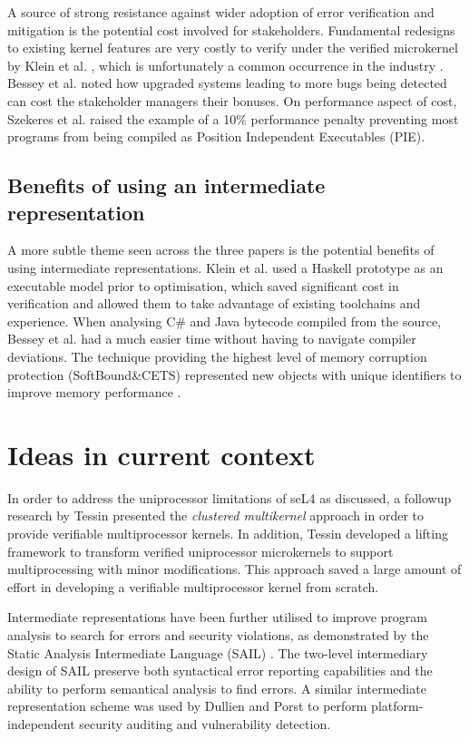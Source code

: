 \documentclass[11pt]{article}
\begin{document}
A source of strong resistance against wider adoption of error verification and mitigation is the potential cost involved for stakeholders. Fundamental redesigns to existing kernel features are very costly to verify under the verified microkernel by Klein et al. \cite[5.3]{klein2009sel4}, which is unfortunately a common occurrence in the industry \cite{israeli2010linux}. Bessey et al. \cite[p. 73]{bessey2010few} noted how upgraded systems leading to more bugs being detected can cost the stakeholder managers their bonuses. On performance aspect of cost, Szekeres et al. \cite[V-A]{szekeres2013sok} raised the example of a 10\% performance penalty preventing most programs from being compiled as Position Independent Executables (PIE).

\subsection{Benefits of using an intermediate representation}

A more subtle theme seen across the three papers is the potential benefits of using intermediate representations. Klein et al. \cite[2.2, 5.2]{klein2009sel4} used a Haskell prototype as an executable model prior to optimisation, which saved significant cost in verification and allowed them to take advantage of existing toolchains and experience. When analysing C\# and Java bytecode compiled from the source, Bessey et al. \cite[p. 72]{bessey2010few} had a much easier time without having to navigate compiler deviations. The technique providing the highest level of memory corruption protection (SoftBound\&CETS) represented new objects with unique identifiers to improve memory performance \cite[VI-C]{szekeres2013sok}. 

\section{Ideas in current context}

In order to address the uniprocessor limitations of seL4 as discussed, a followup research by Tessin \cite{von2012clustered} presented the \emph{clustered multikernel} approach in order to provide verifiable multiprocessor kernels. In addition, Tessin developed a lifting framework to transform verified uniprocessor microkernels to support multiprocessing with minor modifications. This approach saved a large amount of effort in developing a verifiable multiprocessor kernel from scratch.

Intermediate representations have been further utilised to improve program analysis to search for errors and security violations, as demonstrated by the Static Analysis Intermediate Language (SAIL) \cite{dillig2009sail}. The two-level intermediary design of SAIL preserve both syntactical error reporting capabilities and the ability to perform semantical analysis to find errors. A similar intermediate representation scheme was used by Dullien and Porst \cite{dullien2009reil} to perform platform-independent security auditing and vulnerability detection.
\end{document}
